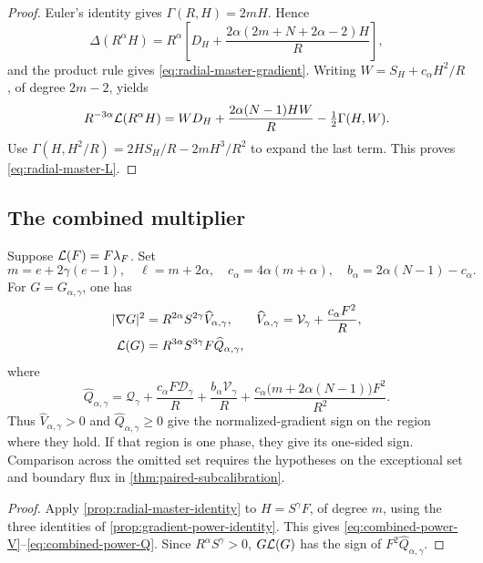 \begin{proof}
Euler's identity gives \(\Gamma(R,H)=2mH\).  Hence
\[
 \Delta(R^\alpha H)
 =R^\alpha\left[D_H+
    \frac{2\alpha(2m+N+2\alpha-2)H}{R}\right],
\]
and the product rule gives \eqref{eq:radial-master-gradient}.
Writing \(W=S_H+c_\alpha H^2/R\), of degree \(2m-2\), yields
\[
 R^{-3\alpha}\mathcal L(R^\alpha H)
 =WD_H+\frac{2\alpha(N-1)HW}{R}-\tfrac12\Gamma(H,W).
\]
Use
\(\Gamma(H,H^2/R)=2HS_H/R-2mH^3/R^2\)
to expand the last term.  This proves \eqref{eq:radial-master-L}.
\end{proof}



\subsection{The combined multiplier}

\begin{proposition}
\label{prop:combined-power-multiplier}
Suppose \(\mathcal L(F)=F\lambda_F\).  Set
\[
 m=e+2\gamma(e-1),\quad \ell=m+2\alpha,\quad
 c_\alpha=4\alpha(m+\alpha),\quad
 b_\alpha=2\alpha(N-1)-c_\alpha.
\]
For \(G=G_{\alpha,\gamma}\), one has
\begin{align}
 |\nabla G|^2
 &=R^{2\alpha}S^{2\gamma}\widehat V_{\alpha,\gamma},
 &\widehat V_{\alpha,\gamma}
 &=\mathcal V_\gamma+\frac{c_\alpha F^2}{R},
 \label{eq:combined-power-V}\\
 \mathcal L(G)
 &=R^{3\alpha}S^{3\gamma}F\widehat Q_{\alpha,\gamma},
 \label{eq:combined-power-L}
\end{align}
where
\begin{equation}\label{eq:combined-power-Q}
 \widehat Q_{\alpha,\gamma}
 =\mathcal Q_\gamma+\frac{c_\alpha F\mathcal D_\gamma}{R}
 +\frac{b_\alpha\mathcal V_\gamma}{R}
 +\frac{c_\alpha\bigl(m+2\alpha(N-1)\bigr)F^2}{R^2}.
\end{equation}
Thus \(\widehat V_{\alpha,\gamma}>0\) and
\(\widehat Q_{\alpha,\gamma}\geq0\) give the normalized-gradient
sign on the region where they hold.  If that region is one phase,
they give its one-sided sign.  Comparison across the omitted set
requires the hypotheses on the exceptional set and boundary flux in
\cref{thm:paired-subcalibration}.
\end{proposition}

\begin{proof}
Apply \cref{prop:radial-master-identity} to \(H=S^\gamma F\), of
degree \(m\), using the three identities of
\cref{prop:gradient-power-identity}. This gives
\eqref{eq:combined-power-V}--\eqref{eq:combined-power-Q}.
Since \(R^\alpha S^\gamma>0\), \(G\mathcal L(G)\) has the sign of
\(F^2\widehat Q_{\alpha,\gamma}\).
\end{proof}

